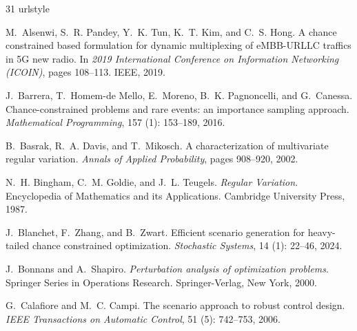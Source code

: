 \documentclass[a4paper, a4wide, 10pt, reqno]{amsart}
\theoremstyle{plain}
\begin{document}
     \begin{thebibliography}{31}
     \small
\providecommand{\natexlab}[1]{#1}
\providecommand{\url}[1]{\texttt{#1}}
\expandafter\ifx\csname urlstyle\endcsname\relax
  \providecommand{\doi}[1]{doi: #1}\else
  \providecommand{\doi}{doi: \begingroup \urlstyle{rm}\Url}\fi

M.~Alsenwi, S.~R. Pandey, Y.~K. Tun, K.~T. Kim, and C.~S. Hong.
\newblock A chance constrained based formulation for dynamic multiplexing of {eMBB-URLLC} traffics in {5G} new radio.
\newblock In \emph{2019 International Conference on Information Networking (ICOIN)}, pages 108--113. IEEE, 2019.

J.~Barrera, T.~Homem-de Mello, E.~Moreno, B.~K. Pagnoncelli, and G.~Canessa.
\newblock Chance-constrained problems and rare events: an importance sampling approach.
\newblock \emph{Mathematical Programming}, 157 (1): 153--189, 2016.

B.~Basrak, R.~A. Davis, and T.~Mikosch.
\newblock A characterization of multivariate regular variation.
\newblock \emph{Annals of Applied Probability}, pages 908--920, 2002.

N.~H. Bingham, C.~M. Goldie, and J.~L. Teugels.
\newblock \emph{Regular Variation}.
\newblock Encyclopedia of Mathematics and its Applications. Cambridge University Press, 1987.

J.~Blanchet, F.~Zhang, and B.~Zwart.
\newblock Efficient scenario generation for heavy-tailed chance constrained optimization.
\newblock \emph{Stochastic Systems}, 14 (1): 22--46, 2024.

J.~Bonnans and A.~Shapiro.
\newblock \emph{Perturbation analysis of optimization problems}.
\newblock Springer Series in Operations Research. Springer-Verlag, New York, 2000.

G.~Calafiore and M.~C. Campi.
\newblock The scenario approach to robust control design.
\newblock \emph{IEEE Transactions on Automatic Control}, 51 (5): 742--753, 2006.



\end{thebibliography}
\end{document}
